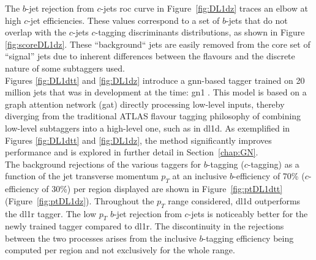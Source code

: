 The $b$-jet rejection from $c$-jets \gls{roc} curve in Figure~\ref{fig:DL1dz} traces an elbow at high $c$-jet efficiencies. These values correspond to a set of $b$-jets that do not overlap with the $c$-jets $c$-tagging discriminants distributions, as shown in Figure \ref{fig:scoreDL1dz}. These ``background`` jets are easily removed from the core set of ``signal'' jets due to inherent differences between the flavours and the discrete nature of some subtaggers used. \\

Figures \ref{fig:DL1dtt} and \ref{fig:DL1dz} introduce a \gls{gnn}-based tagger trained on 20 million jets that was in development at the time: \gls{gn1} \cite{ATL-PHYS-PUB-2022-027}. This model is based on a graph attention network (\gls{gat}) directly processing low-level inputs, thereby diverging from the traditional ATLAS flavour tagging philosophy of combining low-level subtaggers into a high-level one, such as in \gls{dl1d}. As exemplified in Figures \ref{fig:DL1dtt} and \ref{fig:DL1dz}, the method significantly improves performance and is explored in further detail in Section~\ref{chap:GN}. \\

The background rejections of the various taggers for $b$-tagging ($c$-tagging) as a function of the jet transverse momentum $p_T$ at an inclusive $b$-efficiency of 70\% ($c$-efficiency of 30\%) per region displayed are shown in Figure~\ref{fig:ptDL1dtt} (Figure~\ref{fig:ptDL1dz}). Throughout the $p_T$ range considered, \gls{dl1d} outperforms the \gls{dl1r} tagger. The low $p_T$ $b$-jet rejection from $c$-jets is noticeably better for the newly trained tagger compared to \gls{dl1r}. The discontinuity in the rejections between the two processes arises from the inclusive $b$-tagging efficiency being computed per region and not exclusively for the whole range.

